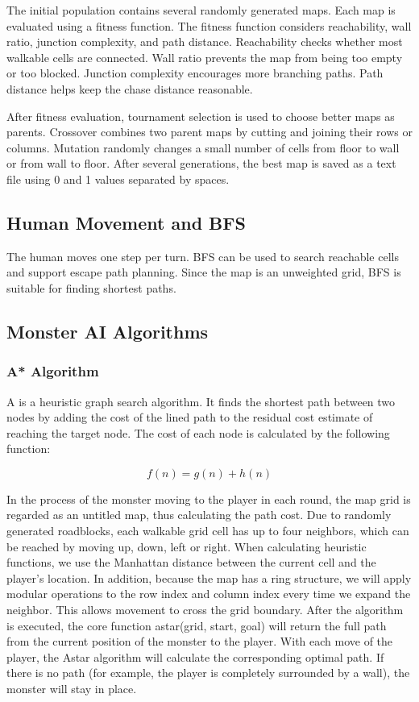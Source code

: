 \documentclass[12pt,a4paper]{article}
\begin{document}
The initial population contains several randomly generated maps. Each map is evaluated using a fitness function. The fitness function considers reachability, wall ratio, junction complexity, and path distance. Reachability checks whether most walkable cells are connected. Wall ratio prevents the map from being too empty or too blocked. Junction complexity encourages more branching paths. Path distance helps keep the chase distance reasonable.

After fitness evaluation, tournament selection is used to choose better maps as parents. Crossover combines two parent maps by cutting and joining their rows or columns. Mutation randomly changes a small number of cells from floor to wall or from wall to floor. After several generations, the best map is saved as a text file using 0 and 1 values separated by spaces.

\subsection{Human Movement and BFS}

The human moves one step per turn. BFS can be used to search reachable cells and support escape path planning. Since the map is an unweighted grid, BFS is suitable for finding shortest paths.

\subsection{Monster AI Algorithms}
\subsubsection{A* Algorithm}
A\* is a heuristic graph search algorithm. It finds the shortest path between two nodes by adding the cost of the lined path to the residual cost estimate of reaching the target node. The cost of each node is calculated by the following function:

\[
f(n) = g(n) + h(n)
\]

In the process of the monster moving to the player in each round, the map grid is regarded as an untitled map, thus calculating the path cost. Due to randomly generated roadblocks, each walkable grid cell has up to four neighbors, which can be reached by moving up, down, left or right. When calculating heuristic functions, we use the Manhattan distance between the current cell and the player's location. In addition, because the map has a ring structure, we will apply modular operations to the row index and column index every time we expand the neighbor. This allows movement to cross the grid boundary. After the algorithm is executed, the core function astar(grid, start, goal) will return the full path from the current position of the monster to the player. With each move of the player, the Astar algorithm will calculate the corresponding optimal path. If there is no path (for example, the player is completely surrounded by a wall), the monster will stay in place. 
\end{document}
